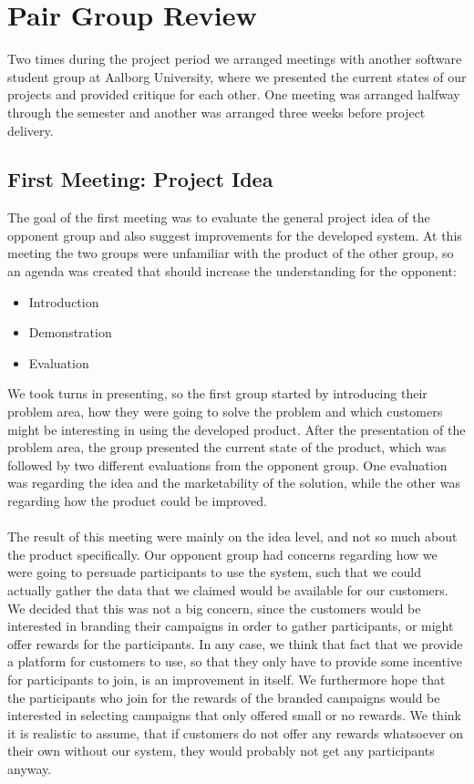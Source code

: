\section{Pair Group Review}
\label{sec:pair_group_review}

Two times during the project period we arranged meetings with another software student group at Aalborg University, where we presented the current states of our projects and provided critique for each other. One meeting was arranged halfway through the semester and another was arranged three weeks before project delivery. 

\subsection{First Meeting: Project Idea}
\label{sub:first_meeting_project_idea}
The goal of the first meeting was to evaluate the general project idea of the opponent group and also suggest improvements for the developed system. At this meeting the two groups were unfamiliar with the product of the other group, so an agenda was created that should increase the understanding for the opponent:

\begin{itemize}
    \item Introduction
    \item Demonstration
    \item Evaluation
\end{itemize}

We took turns in presenting, so the first group started by introducing their problem area, how they were going to solve the problem and which customers might be interesting in using the developed product. After the presentation of the problem area, the group presented the current state of the product, which was followed by two different evaluations from the opponent group. One evaluation was regarding the idea and the marketability of the solution, while the other was regarding how the product could be improved. 
\\\\
The result of this meeting were mainly on the idea level, and not so much about the product specifically. Our opponent group had concerns regarding how we were going to persuade participants to use the system, such that we could actually gather the data that we claimed would be available for our customers. We decided that this was not a big concern, since the customers would be interested in branding their campaigns in order to gather participants, or might offer rewards for the participants. In any case, we think that fact that we provide a platform for customers to use, so that they only have to provide some incentive for participants to join, is an improvement in itself. We furthermore hope that the participants who join for the rewards of the branded campaigns would be interested in selecting campaigns that only offered small or no rewards. We think it is realistic to assume, that if customers do not offer any rewards whatsoever on their own without our system, they would probably not get any participants anyway. 

